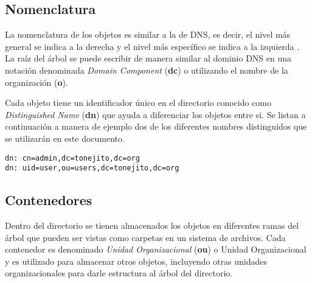   \subsection {Nomenclatura}

La nomenclatura de los objetos es similar a la de DNS, es decir, el nivel m\'{a}s general se indica a la derecha y el nivel m\'{a}s espec\'{i}fico se indica a la izquierda \cite{zytrax}. La ra\'{i}z del \'{a}rbol se puede escribir de manera similar al dominio DNS en una notaci\'{o}n denominada \textit{Domain Component} (\textbf{dc}) o utilizando el nombre de la organizaci\'{o}n (\textbf{o}).

\begin{table}[H]
\caption{Nomenclatura del nodo ra\'{i}z de LDAP}{}
\label{tab:nomenclatura-ldap-root}
\noindent{} %
\end{table}

Cada objeto tiene un identificador \'{u}nico en el directorio conocido como \textit{Distinguished Name} (\textbf{dn}) que ayuda a diferenciar los objetos entre si. Se listan a continuaci\'{o}n a manera de ejemplo dos de los diferentes nombres distinguidos que se utilizar\'{a}n en este documento.

{
\scriptsize
\linespread{1}
\begin{center}
  \verb|dn: cn=admin,dc=tonejito,dc=org|
  \\
  \verb|dn: uid=user,ou=users,dc=tonejito,dc=org|
\end{center}
}

  \subsection{Contenedores}

Dentro del directorio se tienen almacenados los objetos en diferentes ramas del \'{a}rbol que pueden ser vistas como carpetas en un sistema de archivos. Cada contenedor es denominado \textit{Unidad Organizacional} (\textbf{ou}) o Unidad Organizacional y es utilizado para almacenar otros objetos, incluyendo otras unidades organizacionales para darle estructura al \'{a}rbol del directorio.

